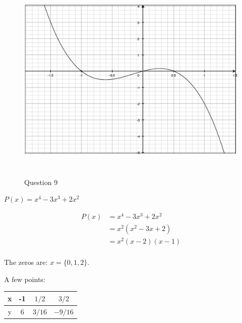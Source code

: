 \documentclass[fleqn,addpoints]{exam}
\begin{document}
\begin{questions}
\begin{solution}
\begin{figure}[H]
  \centering
  \includegraphics[width=14cm,height=10cm]{question_9.eps}
  \caption*{Question 9}
\end{figure}

\end{solution}

\ifprintanswers
\pagebreak
\else
\fi

\question $P(x) = x^4-3x^3+2x^2$
\label{factor:last} 
\begin{solution}
\begin{align*}
  P(x) &= x^4-3x^3+2x^2 \\
  &= x^2(x^2-3x+2) \\
  &= x^2(x-2)(x-1) \\
\end{align*}

The zeros are: $x = \{0, 1, 2 \}$.

A few points:
\begin{tabular}{|c|c|c|c|}
\hline
  x & -1 & $1/2$ & $3/2$   \\
\hline
  y & 6 & $3/16$ & $-9/16$ \\
\hline
\end{tabular}


\end{solution}
\end{questions}
\end{document}
